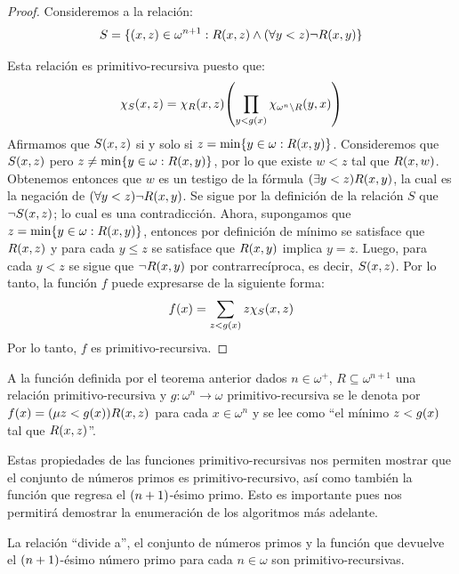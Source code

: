 \begin{proof}
	Consideremos a la relación:
	\[
		S =\set{\pa*{x, z}\in\omega^{n + 1}: R\pa*{x, z}\land\pa*{\forall y < z}\lnot R\pa*{x, y}}
	\]

	Esta relación es primitivo-recursiva puesto que:
	\[
		\CARACTERISTICA{S}\pa*{x, z} =\CARACTERISTICA{R}\pa*{x, z}\pa*{\prod_{y < g\pa*{x}}\CARACTERISTICA{\omega^{n}\setminus R}\pa*{y, x}}
	\]
	Afirmamos que $S\pa*{x, z}$ si y solo si $z =\min\{y\in\omega: R\pa*{x, y}\}$. Consideremos que $S\pa*{x, z}$ pero $z\neq\min\{ y\in\omega: R\pa*{x, y}\}$, por lo que existe $w < z$ tal que $R\pa*{x, w}$. Obtenemos entonces que $w$ es un testigo de la fórmula $\pa*{\exists y < z}R\pa*{x, y}$, la cual es la negación de $\pa*{\forall y < z}\lnot R\pa*{x, y}$. Se sigue por la definición de la relación $S$ que $\lnot S\pa*{x, z}$; lo cual es una contradicción. Ahora, supongamos que $z =\min\{y\in\omega: R\pa*{x, y}\}$, entonces por definición de mínimo se satisface que $R\pa*{x, z}$ y para cada $y\leq z$ se satisface que $R\pa*{x, y}$ implica $y = z$. Luego, para cada $y < z$ se sigue que $\lnot R\pa*{x, y}$ por contrarrecíproca, es decir, $S\pa*{x, z}$.
	Por lo tanto, la función $f$ puede expresarse de la siguiente forma:
	\[
		f\pa*{x} =\sum_{z < g\pa*{x}} z\CARACTERISTICA{S}\pa*{x, z}
	\]
	Por lo tanto, $f$ es primitivo-recursiva.
\end{proof}

\begin{notation}
	A la función definida por el teorema anterior dados $n\in\omega^{+}$, $R\subseteq\omega^{n + 1}$ una relación primitivo-recursiva y $g:\omega^{n}\to\omega$ primitivo-recursiva se le denota por $f\pa*{x} =\pa*{\mu z < g\pa*{x}}R\pa*{x, z}$ para cada $x\in\omega^{n}$ y se lee como ``el mínimo $z < g\pa*{x}$ tal que $R\pa*{x, z}$''.
\end{notation}

Estas propiedades de las funciones primitivo-recursivas nos permiten mostrar que el conjunto de números primos es primitivo-recursivo, así como también la función que regresa el $\pa*{n + 1}$-ésimo primo. Esto es importante pues nos permitirá demostrar la enumeración de los algoritmos más adelante.

\begin{theorem}
	\label{theo: primos_primitivos} %
	La relación ``divide a'', el conjunto de números primos y la función que devuelve el $\pa*{n + 1}$-ésimo número primo para cada $n\in\omega$ son primitivo-recursivas.
\end{theorem}


